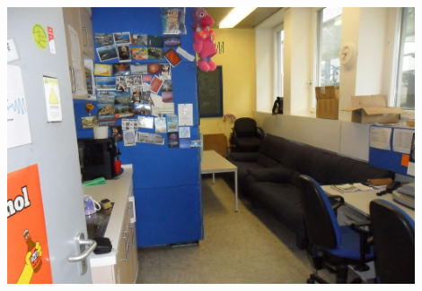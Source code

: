 \enlargethispage{\baselineskip}
\begin{center}
\vspace{-0.4cm}
\includegraphics[width=0.9\textwidth]{res/fsphys_foto_fs_raum_cropped.jpg}
\end{center}

